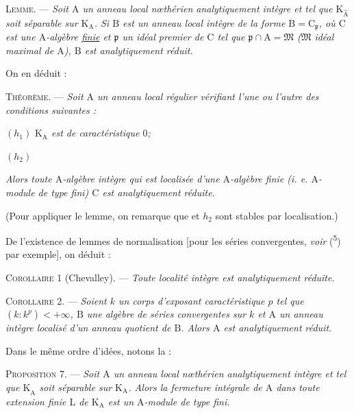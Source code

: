 \textsc{Lemme.} --- \textit{Soit $\mathrm A$ un anneau local nœthérien analytiquement intègre et tel que $\mathrm K_{\widehat{\mathrm A}}$ soit séparable sur $\mathrm K_{\mathrm A}$. Si $\mathrm B$ est un anneau local intègre de la forme $\mathrm B=\mathrm C_{\mathfrak p}$, où $\mathrm C$ est une $\mathrm A$-algèbre \uline{finie} et $\mathfrak p$ un idéal premier de $\mathrm C$ tel que $\mathfrak p\cap\mathrm A=\mathfrak M$ ($\mathfrak M$ idéal maximal de $\mathrm A$), $\mathrm B$ est analytiquement réduit.}

On en déduit :

\textsc{Théorème.} --- \textit{Soit $\mathrm A$ un anneau local régulier vérifiant l’une ou l’autre des conditions suivantes :}

$(h_1)$ \textit{$\mathrm K_{\mathrm A}$ est de caractéristique $0$;}

$(h_2)$ 

\textit{Alors toute $\mathrm A$-algèbre intègre qui est localisée d’une $\mathrm A$-algèbre finie (i. e. $\mathrm A$-module de type fini) $\mathrm C$ est analytiquement réduite.}

(Pour appliquer le lemme, on remarque que  et $h_2$ sont stables par localisation.)

De l’existence de lemmes de normalisation [pour les séries convergentes, \textit{voir} (\textsuperscript{5}) par exemple], on déduit :

\textsc{Corollaire 1} (Chevalley). --- \textit{Toute localité intègre est analytiquement réduite.}

\textsc{Corollaire 2.} --- \textit{Soient $k$ un corps d’exposant caractéristique $p$ tel que $(k:k^p)<+\infty$, $\mathrm B$ une algèbre de séries convergentes sur $k$ et $\mathrm A$ un anneau intègre localisé d’un anneau quotient de $\mathrm B$. Alors $\mathrm A$ est analytiquement réduit.}

Dans le même ordre d’idées, notons la :

\textsc{Proposition 7.} --- \textit{Soit $\mathrm A$ un anneau local nœthérien analytiquement intègre et tel que $\mathrm K_{\widehat{\mathrm A}}$ soit séparable sur $\mathrm K_{\mathrm A}$. Alors la fermeture intégrale de $\mathrm A$ dans toute extension finie $\mathrm L$ de $\mathrm K_{\mathrm A}$ est un $\mathrm A$-module de type fini.}
\margin{\handwritten{$\left.\rule{0pt}{2em}\right]$ connu (Nagata)}}

